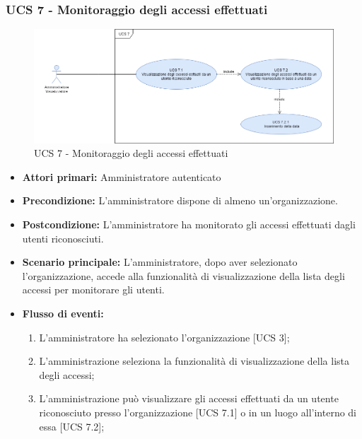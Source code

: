 
\subsubsection{UCS 7 - Monitoraggio degli accessi effettuati}
\begin{figure}[h]
	\centering
	\includegraphics[scale=0.4]{sezioni/UseCase/Immagini/UCS7.png}
	\caption{UCS 7 - Monitoraggio degli accessi effettuati}
\end{figure}

\begin{itemize}
\item \textbf{Attori primari:} Amministratore autenticato
\item \textbf{Precondizione:} L'amministratore dispone di almeno un'organizzazione.
\item \textbf{Postcondizione:} L'amministratore ha monitorato gli accessi effettuati dagli utenti riconosciuti.
\item \textbf{Scenario principale:} L'amministratore, dopo aver selezionato l'organizzazione, accede alla funzionalità di visualizzazione della lista degli accessi per monitorare gli utenti.
\item \textbf{Flusso di eventi:} 
\begin{enumerate}
	\item L'amministratore ha selezionato l'organizzazione [UCS 3];
	\item L'amministrazione seleziona la funzionalità di visualizzazione della lista degli accessi;
	\item L'amministrazione può visualizzare gli accessi effettuati da un utente riconosciuto presso l'organizzazione [UCS 7.1] o in un luogo all'interno di essa [UCS 7.2];
\end{enumerate}
\end{itemize}

